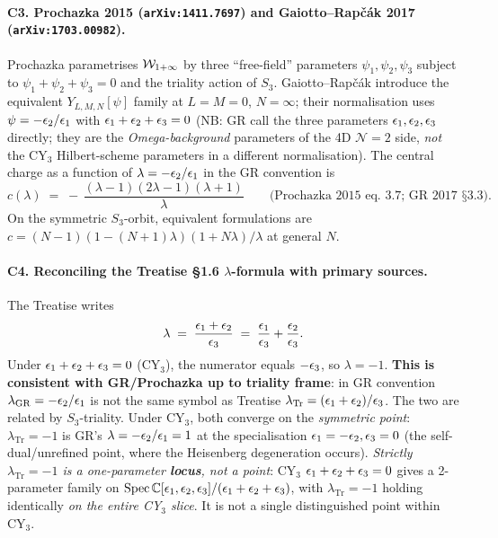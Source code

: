 \paragraph{C3. Prochazka 2015 (\texttt{arXiv:1411.7697}) and
Gaiotto--Rapčák 2017 (\texttt{arXiv:1703.00982}).}
Prochazka parametrises $\mathcal{W}_{1+\infty}$ by three ``free-field'' parameters
$\psi_1, \psi_2, \psi_3$ subject to $\psi_1 + \psi_2 + \psi_3 = 0$
and the triality action of $S_3$. Gaiotto--Rapčák introduce the
equivalent $Y_{L, M, N}[\psi]$ family at $L = M = 0$, $N = \infty$;
their normalisation uses $\psi = -\epsilon_2/\epsilon_1$ with $\epsilon_1 + \epsilon_2
+ \epsilon_3 = 0$ (NB: GR call the three parameters $\epsilon_1, \epsilon_2, \epsilon_3$
directly; they are the \emph{Omega-background} parameters of the 4D
$\mathcal{N}=2$ side, \emph{not} the CY$_3$ Hilbert-scheme parameters
in a different normalisation). The central charge as a function of
$\lambda = -\epsilon_2/\epsilon_1$ in the GR convention is
\[
  c(\lambda) \;=\; -\,\frac{(\lambda-1)(2\lambda-1)(\lambda+1)}{\lambda}
  \qquad\text{(Prochazka 2015 eq.\ 3.7; GR 2017 §3.3).}
\]
On the symmetric $S_3$-orbit, equivalent formulations are
$c = (N-1)(1-(N+1)\lambda)(1+N\lambda)/\lambda$ at general $N$.

\paragraph{C4. Reconciling the Treatise §1.6 $\lambda$-formula with primary sources.}
The Treatise writes
\[
  \lambda \;=\; \frac{\epsilon_1 + \epsilon_2}{\epsilon_3}
  \;=\; \frac{\epsilon_1}{\epsilon_3} + \frac{\epsilon_2}{\epsilon_3}.
\]
Under $\epsilon_1 + \epsilon_2 + \epsilon_3 = 0$ (CY$_3$), the numerator equals
$-\epsilon_3$, so $\lambda = -1$. \textbf{This is consistent with GR/Prochazka
up to triality frame}: in GR convention
$\lambda_{\mathrm{GR}} = -\epsilon_2/\epsilon_1$ is not the same symbol as
Treatise $\lambda_{\mathrm{Tr}} = (\epsilon_1+\epsilon_2)/\epsilon_3$. The two are
related by $S_3$-triality. Under CY$_3$, both converge on the
\emph{symmetric point}: $\lambda_{\mathrm{Tr}} = -1$ is GR's $\lambda =
-\epsilon_2/\epsilon_1 = 1$ at the specialisation $\epsilon_1 = -\epsilon_2, \epsilon_3 = 0$
(the self-dual/unrefined point, where the Heisenberg degeneration
occurs). \emph{Strictly $\lambda_{\mathrm{Tr}} = -1$ is a one-parameter
\textbf{locus}, not a point}: CY$_3$ $\epsilon_1+\epsilon_2+\epsilon_3=0$ gives a
2-parameter family on $\mathrm{Spec}\,\mathbb{C}[\epsilon_1,\epsilon_2,\epsilon_3]/
(\epsilon_1+\epsilon_2+\epsilon_3)$, with $\lambda_{\mathrm{Tr}}=-1$ holding
identically \emph{on the entire CY$_3$ slice}. It is not a single
distinguished point within CY$_3$.

